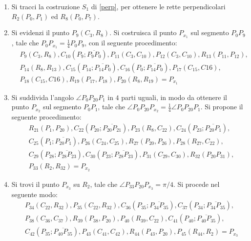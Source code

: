 \begin{enumerate}
\item Si tracci la costruzione $S_1$ di \ref{perp}, per ottenere le rette perpendicolari $R_{2}(P_{0}, P_{1})$ ed $R_{8}(P_{0}, P_{7})$.
\item Si evidenzi il punto $P_{9}(C_{3}, R_{8})$. Si costruisca il punto $P_{x_1}$ sul segmento $P_{0}P_{9}$, tale che $P_{0}P_{x_1} = \frac{1}{4}P_{0}P_{9}$, con il seguente procedimento: 
\begin{align*}
& P_{9}(C_{3},R_{8}), C_{10}(P_{9};\overline{P_{9} P_{0}}), P_{11}(C_{3}, C_{10}), P_{12}(C_{3}, C_{10}), R_{13}(P_{11}, P_{12}), \\
& P_{14}(R_{8}, R_{13}), C_{15}(P_{14};\overline{P_{14} P_{0}}), C_{16}(P_{0};\overline{P_{14} P_{0}}), P_{17}(C_{15}, C{16}), \\
& P_{18}(C_{15}, C{16}), R_{19}(P_{17}, P_{18}), P_{20}(R_{8}, R_{19}) = P_{x_1}
\end{align*}
\item Si suddivida l'angolo $\angle P_{0}P_{20}P_{1}$ in $4$ parti uguali, in modo da ottenere il punto $P_{x_2}$ sul segmento $P_{0}P_{1}$, tale che $\angle P_{0}P_{20}P_{x_2} = \frac{1}{4} \angle P_{0}P_{20}P_{1}$. Si propone il seguente procedimento:
\begin{align*}
& R_{21}(P_{1},P_{20}), C_{22}(P_{20};\overline{P_{20} P_{21}}), P_{23}(R_{8}, C_{22}), C_{24}(P_{23};\overline{P_{20} P_{1}}), \\
& C_{25}(P_{1};\overline{P_{20} P_{1}}), P_{26}(C_{24}, C_{25}), R_{27}(P_{20}, P_{26}), P_{28}(R_{27}, C_{22}), \\
& C_{29}(P_{28};\overline{P_{28} P_{23}}), C_{30}(P_{23}; \overline{P_{28} P_{23}}), P_{31}(C_{29}, C_{30}), R_{32}(P_{20} P_{31}), \\
& P_{33} (R_{2}, R_{32}) =  P_{x_2}
\end{align*}
\item Si trovi il punto $P_{x_3}$ su $R_2$, tale che $\angle P_{33}P_{20}P_{x_3} = \pi/4$. Si procede nel seguente modo:
\begin{align*}
& P_{34}(C_{22},R_{32}), P_{35}(C_{22},R_{32}), C_{36}(P_{35};\overline{P_{34} P_{35}}), C_{37}(P_{34};\overline{P_{34} P_{35}}), \\
& P_{38}(C_{36},C_{37}), R_{39}(P_{38}, P_{20}), P_{40}(R_{39}, C_{22}), C_{41}(P_{40};\overline{P_{40} P_{35}}), \\
&  C_{42}(P_{35};\overline{P_{40} P_{35}}), P_{43}(C_{41}, C_{42}), R_{44}(P_{43}, P_{20}), P_{45}(R_{44}, R_{2}) = P_{x_3}

\end{align*}
\end{enumerate}
